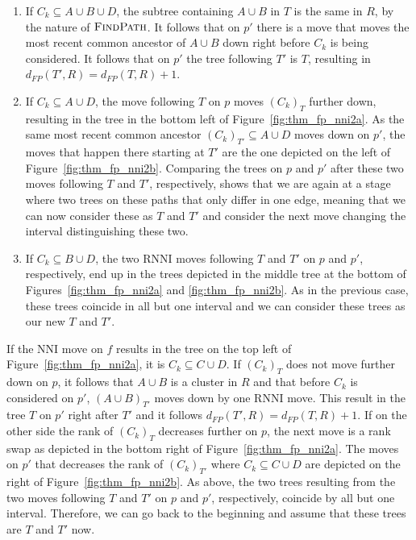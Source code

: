 \documentclass{amsart}
\newcommand{\rnni}{\mathrm{RNNI}}
\newcommand{\findpath}{\textsc{FindPath}}
\newcommand{\nni}{\mathrm{NNI}}
\begin{document}
\begin{enumerate}
    \begin{enumerate}
        \item
            If $C_k \subseteq A \cup B \cup D$, the subtree containing $A \cup B$ in $T$ is the same in $R$, by the nature of $\findpath$.
            It follows that on $p'$ there is a move that moves the most recent common ancestor of $A \cup B$ down right before $C_k$ is being considered.
            It follows that on $p'$ the tree following $T'$ is $T$, resulting in $d_{FP}(T',R) = d_{FP}(T,R) + 1$.
        \item
            If $C_k \subseteq A \cup D$, the move following $T$ on $p$ moves $(C_k)_T$ further down, resulting in the tree in the bottom left of Figure~\ref{fig:thm_fp_nni2a}.
            As the same most recent common ancestor $(C_k)_{T'} \subseteq A \cup D$ moves down on $p'$, the moves that happen there starting at $T'$ are the one depicted on the left of Figure~\ref{fig:thm_fp_nni2b}.
            Comparing the trees on $p$ and $p'$ after these two moves following $T$ and $T'$, respectively, shows that we are again at a stage where two trees on these paths that only differ in one edge, meaning that we can now consider these as $T$ and $T'$ and consider the next move changing the interval distinguishing these two.
        \item
            If $C_k \subseteq B \cup D$, the two $\rnni$ moves following $T$ and $T'$ on $p$ and $p'$, respectively, end up in the trees depicted in the middle tree at the bottom of Figures~\ref{fig:thm_fp_nni2a} and \ref{fig:thm_fp_nni2b}.
            As in the previous case, these trees coincide in all but one interval and we can consider these trees as our new $T$ and $T'$.
    \end{enumerate}

    If the $\nni$ move on $f$ results in the tree on the top left of Figure~\ref{fig:thm_fp_nni2a}, it is $C_k \subseteq C \cup D$.
    If $(C_k)_T$ does not move further down on $p$, it follows that $A \cup B$ is a cluster in $R$ and that before $C_k$ is considered on $p'$, $(A \cup B)_{T'}$ moves down by one $\rnni$ move.
    This result in the tree $T$ on $p'$ right after $T'$ and it follows $d_{FP}(T',R) = d_{FP}(T,R) + 1$.
    If on the other side the rank of $(C_k)_T$ decreases further on $p$, the next move is a rank swap as depicted in the bottom right of Figure~\ref{fig:thm_fp_nni2a}.
    The moves on $p'$ that decreases the rank of $(C_k)_{T'}$ where $C_k \subseteq C \cup D$ are depicted on the right of Figure~\ref{fig:thm_fp_nni2b}.
    As above, the two trees resulting from the two moves following $T$ and $T'$ on $p$ and $p'$, respectively, coincide by all but one interval.
    Therefore, we can go back to the beginning and assume that these trees are $T$ and $T'$ now.


\end{enumerate}
\end{document}

